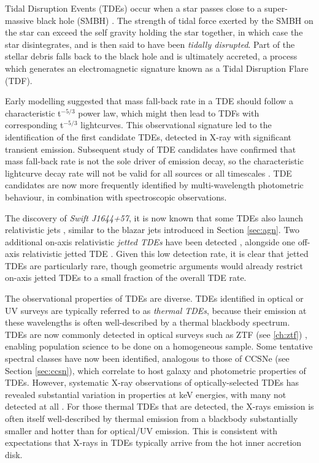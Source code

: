 Tidal Disruption Events (TDEs) occur when a star passes close to a super-massive black hole (SMBH) . The strength of tidal force exerted by the SMBH on the star can exceed the self gravity holding the star together, in which case the star disintegrates, and is then said to have been \emph{tidally disrupted}. Part of the stellar debris falls back to the black hole and is ultimately accreted, a process which generates an electromagnetic signature known as a Tidal Disruption Flare (TDF).

Early modelling  suggested that mass fall-back rate in a TDE should follow a characteristic t$^{-5/3}$ power law, which might then lead to TDFs with corresponding t$^{-5/3}$ lightcurves. This observational signature led to the identification  of the first candidate TDEs, detected in X-ray with significant transient emission. Subsequent study of TDE candidates have confirmed that mass fall-back rate is not the sole driver of emission decay, so the characteristic lightcurve decay rate will not be valid for all sources or all timescales . TDE candidates are now more frequently identified by multi-wavelength photometric behaviour, in combination with spectroscopic observations.

The discovery of \emph{Swift J1644+57}, it is now known that some TDEs also launch relativistic jets , similar to the blazar jets introduced in Section \ref{sec:agn}. Two additional on-axis relativistic \emph{jetted TDEs} have been detected \cite{auchettl_17}, alongside one off-axis relativistic jetted TDE . Given this low detection rate, it is clear that jetted TDEs are particularly rare, though geometric arguments would already restrict on-axis jetted TDEs to a small fraction of the overall TDE rate.

The observational properties of TDEs are diverse. TDEs identified in optical or UV surveys are typically referred to as \emph{thermal TDEs}, because their emission at these wavelengths is often well-described by a thermal blackbody spectrum. TDEs are now commonly detected in optical surveys such as ZTF (see \ref{ch:ztf}) , enabling population science to be done on a homogeneous sample. Some tentative spectral classes have now been identified, analogous to those of CCSNe (see Section \ref{sec:ccsn}), which correlate to host galaxy and photometric properties of TDEs. However, systematic X-ray observations of optically-selected TDEs has revealed substantial variation in properties at keV energies, with many not detected at all \cite{van_velzen_20}. For those thermal TDEs that are detected, the X-rays emission is often itself well-described by thermal emission from a blackbody substantially smaller and hotter than for optical/UV emission. This is consistent with expectations that X-rays in TDEs typically arrive from the hot inner accretion disk. 

